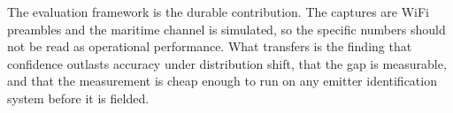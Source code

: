 \documentclass{article}
\begin{document}
The evaluation framework is the durable contribution. The captures are WiFi
preambles and the maritime channel is simulated, so the specific numbers should
not be read as operational performance. What transfers is the finding that
confidence outlasts accuracy under distribution shift, that the gap is
measurable, and that the measurement is cheap enough to run on any emitter
identification system before it is fielded.

\clearpage


\end{document}
